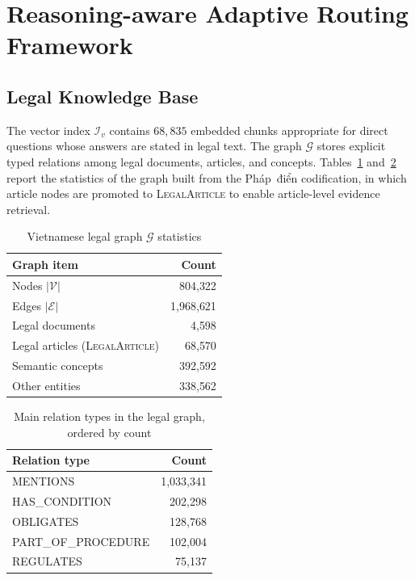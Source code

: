 \section{Reasoning-aware Adaptive Routing Framework}\label{sec:routing_framework}

\subsection{Legal Knowledge Base}\label{subsec:legal_kb}

The vector index $\mathcal{I}_v$ contains $68{,}835$ embedded chunks
appropriate for direct questions whose answers are stated in legal text. The
graph $\mathcal{G}$ stores explicit typed relations among legal documents,
articles, and concepts. Tables~\ref{tab:graph_stats}
and~\ref{tab:graph_relations} report the statistics of the graph built from
the Pháp~điển codification, in which article nodes are promoted to
\textsc{LegalArticle} to enable article-level evidence retrieval.

\begin{table}[!htbp]
\centering
\caption{Vietnamese legal graph $\mathcal{G}$ statistics}\label{tab:graph_stats}
\begin{tabular}{lr}
\toprule
\textbf{Graph item} & \textbf{Count} \\
\midrule
Nodes $|\mathcal{V}|$ & 804{,}322 \\
Edges $|\mathcal{E}|$ & 1{,}968{,}621 \\
Legal documents & 4{,}598 \\
Legal articles (\textsc{LegalArticle}) & 68{,}570 \\
Semantic concepts & 392{,}592 \\
Other entities & 338{,}562 \\
\bottomrule
\end{tabular}
\end{table}

\begin{table}[!htbp]
\centering
\caption{Main relation types in the legal graph, ordered by count}\label{tab:graph_relations}
\begin{tabular}{lr}
\toprule
\textbf{Relation type} & \textbf{Count} \\
\midrule
\textsc{MENTIONS} & 1{,}033{,}341 \\
\textsc{HAS\_CONDITION} & 202{,}298 \\
\textsc{OBLIGATES} & 128{,}768 \\
\textsc{PART\_OF\_PROCEDURE} & 102{,}004 \\
\textsc{REGULATES} & 75{,}137 \\
\bottomrule
\end{tabular}
\end{table}

